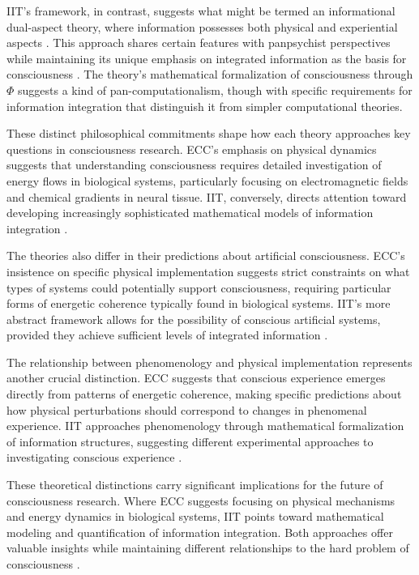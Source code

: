 IIT's framework, in contrast, suggests what might be termed an informational dual-aspect theory, where information possesses both physical and experiential aspects \cite{Tononi2016}. This approach shares certain features with panpsychist perspectives while maintaining its unique emphasis on integrated information as the basis for consciousness \cite{Mathews2011}. The theory's mathematical formalization of consciousness through $\Phi$ suggests a kind of pan-computationalism, though with specific requirements for information integration that distinguish it from simpler computational theories.

These distinct philosophical commitments shape how each theory approaches key questions in consciousness research. ECC's emphasis on physical dynamics suggests that understanding consciousness requires detailed investigation of energy flows in biological systems, particularly focusing on electromagnetic fields and chemical gradients in neural tissue. IIT, conversely, directs attention toward developing increasingly sophisticated mathematical models of information integration \cite{Oizumi2014}.

The theories also differ in their predictions about artificial consciousness. ECC's insistence on specific physical implementation suggests strict constraints on what types of systems could potentially support consciousness, requiring particular forms of energetic coherence typically found in biological systems. IIT's more abstract framework allows for the possibility of conscious artificial systems, provided they achieve sufficient levels of integrated information \cite{Koch2019}.

The relationship between phenomenology and physical implementation represents another crucial distinction. ECC suggests that conscious experience emerges directly from patterns of energetic coherence, making specific predictions about how physical perturbations should correspond to changes in phenomenal experience. IIT approaches phenomenology through mathematical formalization of information structures, suggesting different experimental approaches to investigating conscious experience \cite{Shani2015}.

These theoretical distinctions carry significant implications for the future of consciousness research. Where ECC suggests focusing on physical mechanisms and energy dynamics in biological systems, IIT points toward mathematical modeling and quantification of information integration. Both approaches offer valuable insights while maintaining different relationships to the hard problem of consciousness \cite{Goff2019}.

